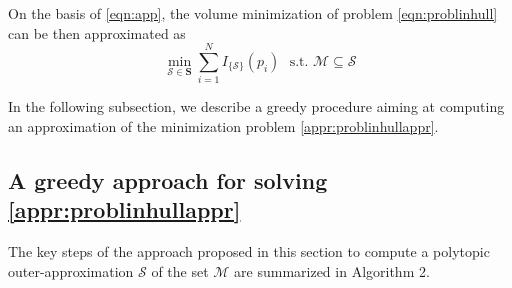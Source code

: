\documentclass[twocolumn]{autart}
\newtheorem{remark}{Remark}{\normalfont}{\normalfont}
\begin{document}
On the basis of \eqref{eqn:app}, the volume minimization of problem \eqref{eqn:problinhull} can be then approximated as
\begin{equation} \label{appr:problinhullappr}
\min_{\mathcal{S} \in \mathbf{S}}\sum_{i=1}^N I_{\{\mathcal{S}\}}(p_i) ~~~ \mbox{s.t. }  \mathcal{M} \subseteq 
\mathcal{S}
\end{equation}


In the following subsection, we describe a greedy procedure aiming at computing an approximation of the  minimization problem \eqref{appr:problinhullappr}.

\subsection{A greedy approach for solving \eqref{appr:problinhullappr}}
The key steps of the approach proposed in this section  to compute a polytopic outer-approximation $\mathcal{S}$ of the   set $\mathcal{M}$ are  summarized in Algorithm 2. %
\end{document}
